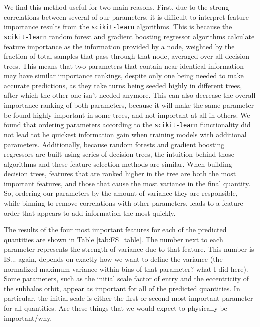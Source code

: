 \documentclass[fleqn,usenatbib]{mnras}
\newcommand\edits[1]{{\color{red}#1}}
\begin{document}
We find this method useful for two main reasons. First, due to the strong correlations between several of our parameters, it is difficult to interpret feature importance results from the \texttt{scikit-learn} algorithms. This is because the \texttt{scikit-learn} random forest and gradient boosting regressor algorithms calculate feature importance as the information provided by a node, weighted by the fraction of total samples that pass through that node, averaged over all decision trees. This means that two parameters that contain near identical information may have similar importance rankings, despite only one being needed to make accurate predictions, \edits{as they take turns being seeded highly in different trees, after which the other one isn't needed anymore}. This can also decrease the overall importance ranking of both parameters, because \edits{it will make the same parameter be found highly important in some trees, and not important at all in others.} We found that ordering parameters according to the \texttt{scikit-learn} functionality did not lead tot he quickest information gain when training models with additional parameters. Additionally, because random forests and gradient boosting regressors are built using series of decision trees, the intuition behind those algorithms and these feature selection methods are similar. When building decision trees, features that are ranked higher in the tree are both the most important features, and those that cause the most variance in the final quantity. So, ordering our parameters by the amount of variance they are responsible, while binning to remove correlations with other parameters, leads to a feature order that appears to add information the most quickly.

The results of the four most important features for each of the predicted quantities are shown in Table \ref{tab:FS_table}. The number next to each parameter represents the strength of variance due to that feature. This number is \edits{IS... again, depends on exactly how we want to define the variance} (the normalized maximum variance within bins of that parameter? what I did here). Some parameters, such as the initial scale factor of entry and the eccentricity of the subhalos orbit, appear as important for all of the predicted quantities. In particular, the initial scale is either the first or second most important parameter for all quantities. \edits{Are these things that we would expect to physically be important/why}.
\end{document}
